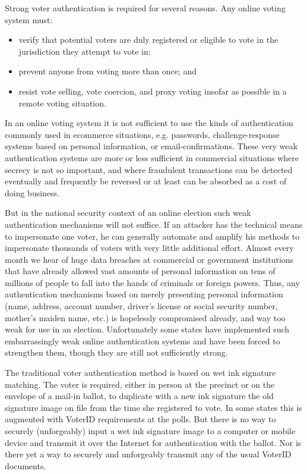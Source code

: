 Strong voter authentication is required for several reasons. Any
online voting system must:

\begin{itemize}
\item verify that potential voters are duly registered or eligible to
  vote in the jurisdiction they attempt to vote in;
\item prevent anyone from voting more than once; and
\item resist vote selling, vote coercion, and proxy voting insofar as
  possible in a remote voting situation.
\end{itemize}

In an online voting system it is not sufficient to use the kinds of
authentication commonly used in ecommerce situations, e.g. passwords,
challenge-response systems based on personal information, or
email-confirmations. These very weak authentication systems are more
or less sufficient in commercial situations where secrecy is not so
important, and where fraudulent transactions can be detected
eventually and frequently be reversed or at least can be absorbed as a
cost of doing business. 

But in the national security context of an online election such weak
authentication mechanisms will not suffice. If an attacker has the
technical means to impersonate one voter, he can generally automate
and amplify his methods to impersonate thousands of voters with very
little additional effort. Almost every month we hear of huge data
breaches at commercial or government institutions that have already
allowed vast amounts of personal information on tens of millions of
people to fall into the hands of criminals or foreign powers. Thus,
any authentication mechanisms based on merely presenting personal
information (name, address, account number, driver’s license or social
security number, mother’s maiden name, etc.) is hopelessly compromised
already, and way too weak for use in an election. Unfortunately some
states have implemented such embarrassingly weak online authentication
systems and have been forced to strengthen them, though they are still
not sufficiently strong.

The traditional voter authentication method is based on wet ink
signature matching. The voter is required, either in person at the
precinct or on the envelope of a mail-in ballot, to duplicate with a
new ink signature the old signature image on file from the time she
registered to vote. In some states this is augmented with VoterID
requirements at the polls. But there is no way to securely
(unforgeably) input a wet ink signature image to a computer or mobile
device and transmit it over the Internet for authentication with the
ballot. Nor is there yet a way to securely and unforgeably transmit
any of the usual VoterID documents.

